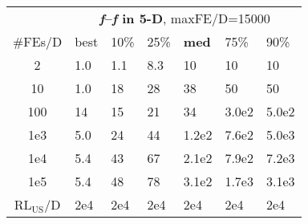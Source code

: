 \begin{tabular}{c|llllll}
 & \multicolumn{6}{|c}{\textbf{\textit{f}\raisebox{-0.35ex}{1}--\textit{f}\raisebox{-0.35ex}{24} in 5-D}, maxFE/D=15000}\\
\#FEs/D & best & 10\% & 25\% & \textbf{med} & 75\% & 90\%\\
2 & \hspace*{1ex}1.0 & \hspace*{1ex}1.1 & \hspace*{1ex}8.3 & 10 & 10 & 10\\
10 & \hspace*{1ex}1.0 & 18 & 28 & 38 & 50 & 50\\
100 & 14 & 15 & 21 & 34 & 3.0e2 & 5.0e2\\
1e3 & \hspace*{1ex}5.0 & 24 & 44 & 1.2e2 & 7.6e2 & 5.0e3\\
1e4 & \hspace*{1ex}5.4 & 43 & 67 & 2.1e2 & 7.9e2 & 7.2e3\\
1e5 & \hspace*{1ex}5.4 & 48 & 78 & 3.1e2 & 1.7e3 & 3.1e3\\
$\text{RL}_{\text{US}}$/D & 2e4 & 2e4 & 2e4 & 2e4 & 2e4 & 2e4
\end{tabular}
